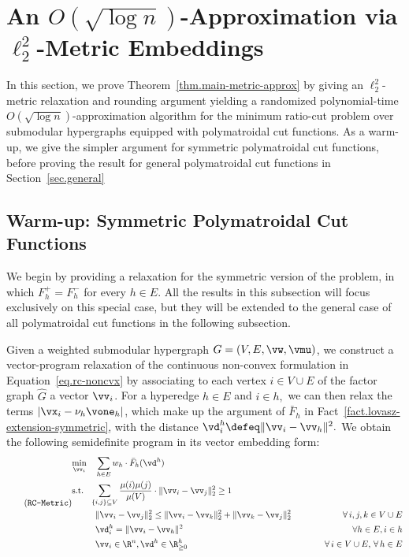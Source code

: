 \documentclass[letterpaper]{article}
\begin{document}
\section{An $O(\sqrt{\log n})$-Approximation via $\ell_2^2$-Metric Embeddings}
\label{sec.sdp-algorithm}

In this section, we prove Theorem~\ref{thm.main-metric-approx} by giving an $\ell_2^2$-metric relaxation and rounding argument yielding a randomized polynomial-time $O(\sqrt{\log n})$-approximation algorithm for the minimum ratio-cut problem over submodular hypergraphs equipped with polymatroidal cut functions. As a warm-up, we give the simpler argument for symmetric polymatroidal cut functions, before proving the result for general polymatroidal cut functions in Section~\ref{sec.general}

\subsection{Warm-up: Symmetric Polymatroidal Cut Functions}

We begin by providing a relaxation for the symmetric version of the problem, in which $F_h^+ = F_h^-$ for every $h \in E$. All the results in this subsection will focus exclusively on this special case, but they will be extended to the general case of all polymatroidal cut functions in the following subsection.

Given a weighted submodular hypergraph $G = (V, E, \vw, \vmu)$, we construct a vector-program relaxation of the continuous non-convex formulation in Equation~\eqref{eq.rc-noncvx} by associating to each vertex $i \in V \cup E$ of the factor graph $\hat{G}$
a vector $\vv_i$. For a hyperedge $h \in E$ and $i \in h,$ we can then relax the terms $|\vx_i - \nu_h\vone_h|$, which make up the argument of $\bar{F}_h$ in  Fact~\ref{fact.lovasz-extension-symmetric}, with the distance $\vd^h_i \defeq \|\vv_i - \vv_h\|^2.$ We obtain the following semidefinite program in its vector embedding form:
\begin{equation*}
\stepcounter{equation}
\tag{\texttt{RC-Metric}}
\label{eqn.vector-program}
\begin{aligned}
& \underset{\vv_i}{\min}
& & \sum_{h \in E} w_h \cdot \bar{F}_h ( \vd^h) &\\
& \textup{s.t.}
&& \hspace{-2mm}\sum_{\{i,j\} \subseteq V} {\mu(i) \mu(j) \over \mu(V)} \cdot \|\vv_i - \vv_j\|_2^2 \geq 1 &\\
& & & \|\vv_i -\vv_j \|^2_2 \leq \|\vv_i - \vv_k \|_2^2 + \|\vv_k - \vv_j\|_2^2
& \forall \, i, j, k \in V \cup E \\
& & &\vd^h_i =   \|\vv_i - \vv_h\|^2 & \forall h \in E, i \in h \\
& & & \vv_i \in \R^n, \vd^h \in \R^h_{\geq 0}
& \hspace{1cm} \forall \, i \in V \cup E, \, \forall \, h \in E
\end{aligned}
\end{equation*}
\end{document}
